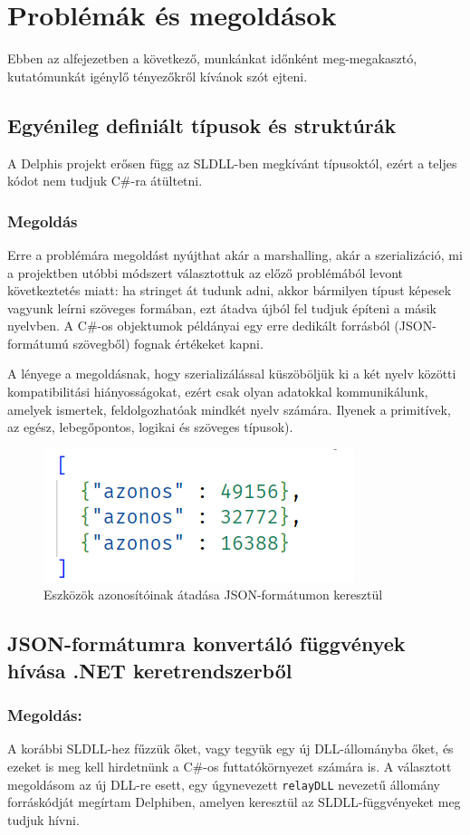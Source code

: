 \documentclass[tocnopagenum]{thesis-ekf}
\theoremstyle{definition}
\theoremstyle{remark}
\begin{document}
	\section{Problémák és megoldások}
	Ebben az alfejezetben a következő, munkánkat időnként meg-megakasztó, kutatómunkát igénylő tényezőkről kívánok szót ejteni.
	\subsection{Egyénileg definiált típusok és struktúrák}
	A Delphis projekt erősen függ az SLDLL-ben megkívánt típusoktól, ezért a teljes kódot nem tudjuk C\#-ra átültetni.
	\subsubsection{Megoldás} 
	Erre a problémára megoldást nyújthat akár a marshalling, akár a szerializáció, mi a projektben utóbbi módszert választottuk az előző problémából levont következtetés miatt: ha stringet át tudunk adni, akkor bármilyen típust képesek vagyunk leírni szöveges formában, ezt átadva újból fel tudjuk építeni a másik nyelvben. A C\#-os objektumok példányai egy erre dedikált forrásból (JSON-formátumú szövegből) fognak értékeket kapni.
	
	A lényege a megoldásnak, hogy szerializálással küszöböljük ki a két nyelv közötti kompatibilitási hiányosságokat, ezért csak olyan adatokkal kommunikálunk, amelyek ismertek, feldolgozhatóak mindkét nyelv számára. Ilyenek a primitívek, az egész, lebegőpontos, logikai és szöveges típusok).
	\begin{figure}[h!]
		\centering
		\includegraphics[scale=0.89]{json_szerializalas_azonositok}
		\caption{Eszközök azonosítóinak átadása JSON-formátumon keresztül}
		\label{json_azonositok}
	\end{figure}
	\subsection{JSON-formátumra konvertáló függvények hívása .NET keretrendszerből}
	\subsubsection{Megoldás:} A korábbi SLDLL-hez fűzzük őket, vagy tegyük egy új DLL-állományba őket, és ezeket is meg kell hirdetnünk a C\#-os futtatókörnyezet számára is. A választott megoldásom az új DLL-re esett, egy úgynevezett \verb*|relayDLL| nevezetű állomány forráskódját megírtam Delphiben, amelyen keresztül az SLDLL-függvényeket meg tudjuk hívni.
	
\end{document}
